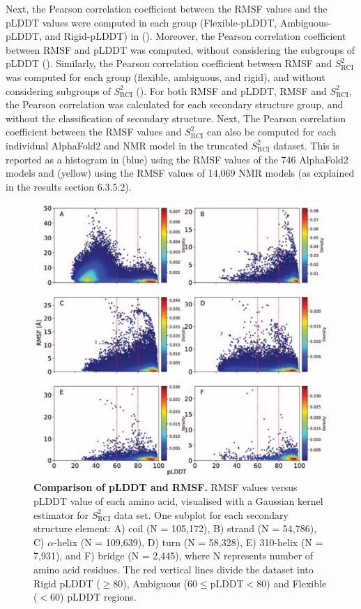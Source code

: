 Next, the Pearson correlation coefficient between the RMSF values and the pLDDT values were computed in each group (Flexible-pLDDT, Ambiguous-pLDDT, and Rigid-pLDDT) in (). Moreover, the Pearson correlation coefficient between RMSF and pLDDT was computed, without considering the subgroups of pLDDT (). Similarly, the Pearson correlation coefficient between RMSF and $S_{\text{RCI}}^{2}$ was computed for each group (flexible, ambiguous, and rigid), and without considering subgroups of $S_{\text{RCI}}^{2}$ (). For both RMSF and pLDDT, RMSF and $S_{\text{RCI}}^{2}$, the Pearson correlation was calculated for each secondary structure group, and without the classification of secondary structure.
Next, The Pearson correlation coefficient between the RMSF values and $S_{\text{RCI}}^{2}$ can also be computed for each individual AlphaFold2 and NMR model in the truncated $S_{\text{RCI}}^{2}$ dataset. This is reported as a histogram in  (blue) using the RMSF values of the 746 AlphaFold2 models and  (yellow) using the RMSF values of 14,069 NMR models (as explained in the results section 6.3.5.2).

\begin{figure}[H]
    \centering
    \includegraphics[width=\linewidth]{pLDDT//plddt_figures//supplementary_bhawna/supfig16.pdf}
    \caption{\textbf{Comparison of pLDDT and RMSF.} RMSF values versus pLDDT value of each amino acid, visualised with a Gaussian kernel estimator for $S_{\text{RCI}}^{2}$ data set. One subplot for each secondary structure element: A) coil (N = 105,172), B) strand (N = 54,786), C) $\alpha$-helix (N = 109,639), D) turn (N = 58,328), E) 310-helix (N = 7,931), and F) bridge (N = 2,445), where N represents number of amino acid residues. The red vertical lines divide the dataset into Rigid pLDDT ($\geq 80$), Ambiguous ($60 \leq \text{pLDDT} < 80$) and Flexible ($< 60$) pLDDT regions.}
    \label{fig:plddt_sup:sup16}
\end{figure}

